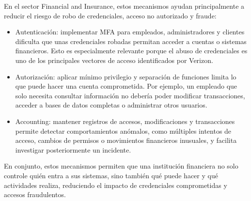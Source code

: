 
\begin{respuesta}
  En el sector Financial and Insurance, estos mecanismos ayudan principalmente a reducir el riesgo de robo de credenciales, acceso no autorizado y fraude:
  \begin{itemize}
    \item Autenticación: implementar MFA para empleados, administradores y clientes dificulta que unas credenciales robadas permitan acceder a cuentas o sistemas financieros. Esto es especialmente relevante porque el abuso de credenciales es uno de los principales vectores de acceso identificados por Verizon.
    \item Autorización: aplicar mínimo privilegio y separación de funciones limita lo que puede hacer una cuenta comprometida. Por ejemplo, un empleado que solo necesita consultar información no debería poder modificar transacciones, acceder a bases de datos completas o administrar otros usuarios.
    \item Accounting: mantener registros de accesos, modificaciones y transacciones permite detectar comportamientos anómalos, como múltiples intentos de acceso, cambios de permisos o movimientos financieros inusuales, y facilita investigar posteriormente un incidente.
  \end{itemize}
  En conjunto, estos mecanismos permiten que una institución financiera no solo controle quién entra a sus sistemas, sino también qué puede hacer y qué actividades realiza, reduciendo el impacto de credenciales comprometidas y accesos fraudulentos.
\end{respuesta}

